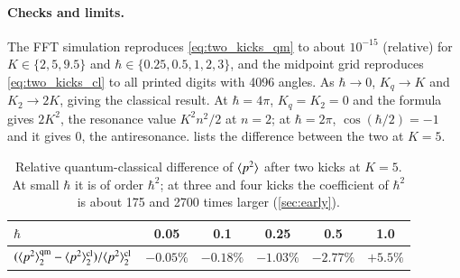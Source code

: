 \paragraph{Checks and limits.}
The FFT simulation reproduces \cref{eq:two_kicks_qm} to about $10^{-15}$ (relative) for
$K \in \{2, 5, 9.5\}$ and $\hbar \in \{0.25, 0.5, 1, 2, 3\}$, and the midpoint grid reproduces
\cref{eq:two_kicks_cl} to all printed digits with 4096 angles. As $\hbar\to0$, $K_q\to K$ and $K_2\to2K$, giving
the classical result. At $\hbar = 4\pi$, $K_q = K_2 = 0$ and the formula gives $2K^2$, the resonance value
$K^2n^2/2$ at $n = 2$; at $\hbar = 2\pi$, $\cos(\hbar/2) = -1$ and it gives 0, the antiresonance.
 lists the difference between the two at $K = 5$.

\begin{table}[!htbp]
\centering
\small
\begin{tabular}{@{}lccccc@{}}
\toprule
$\hbar$ & 0.05 & 0.1 & 0.25 & 0.5 & 1.0 \\
\midrule
$(\langle p^2 \rangle_2^{\rm qm} - \langle p^2 \rangle_2^{\rm cl})/\langle p^2 \rangle_2^{\rm cl}$ & $-0.05\%$ & $-0.18\%$ & $-1.03\%$ & $-2.77\%$ & $+5.5\%$ \\
\bottomrule
\end{tabular}
\caption{Relative quantum-classical difference of $\langle p^2 \rangle$ after two kicks at $K = 5$. At small $\hbar$ it
is of order $\hbar^2$; at three and four kicks the coefficient of $\hbar^2$ is about 175 and 2700 times
larger (\cref{sec:early}).}
\label{tab:two_kick_gap}
\end{table}
